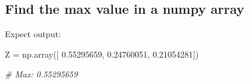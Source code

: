\documentclass[11pt]{article}
\newenvironment{Shaded}{}{}
\newcommand{\FloatTok}[1]{\textcolor[rgb]{0.25,0.63,0.44}{{#1}}}
\newcommand{\CommentTok}[1]{\textcolor[rgb]{0.38,0.63,0.69}{\textit{{#1}}}}
\newcommand{\NormalTok}[1]{{#1}}
\newcommand{\OperatorTok}[1]{\textcolor[rgb]{0.40,0.40,0.40}{{#1}}}
\begin{document}
    \subsection{Find the max value in a numpy
array}\label{find-the-max-value-in-a-numpy-array}

Expect output:

\begin{Shaded}
\begin{Highlighting}[]
\NormalTok{Z }\OperatorTok{=}\NormalTok{ np.array([ }\FloatTok{0.55295659}\NormalTok{,  }\FloatTok{0.24760051}\NormalTok{,  }\FloatTok{0.21054281}\NormalTok{])}
       
\CommentTok{# Max: 0.55295659}
\end{Highlighting}
\end{Shaded}


    
    
    
    
\end{document}
